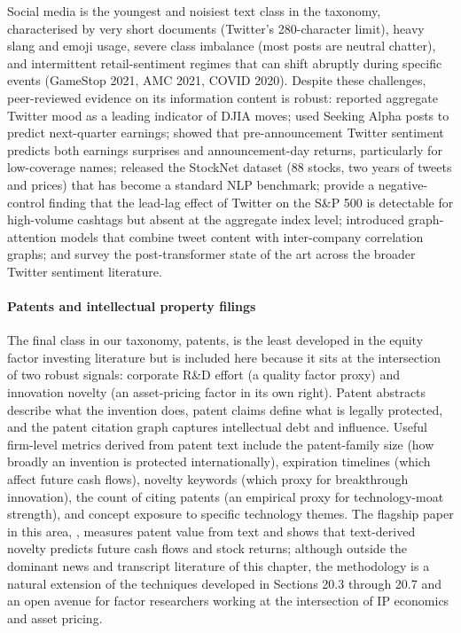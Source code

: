 Social media is the youngest and noisiest text class in the taxonomy, characterised by very short documents (Twitter's 280-character limit), heavy slang and emoji usage, severe class imbalance (most posts are neutral chatter), and intermittent retail-sentiment regimes that can shift abruptly during specific events (GameStop 2021, AMC 2021, COVID 2020). Despite these challenges, peer-reviewed evidence on its information content is robust: \cite{bollen2011twitter} reported aggregate Twitter mood as a leading indicator of DJIA moves; \cite{chen2014wisdom} used Seeking Alpha posts to predict next-quarter earnings; \cite{bartov2018twitter} showed that pre-announcement Twitter sentiment predicts both earnings surprises and announcement-day returns, particularly for low-coverage names; \cite{xu2018stock} released the StockNet dataset (88 stocks, two years of tweets and prices) that has become a standard NLP benchmark; \cite{zheludev2014when} provide a negative-control finding that the lead-lag effect of Twitter on the S\&P 500 is detectable for high-volume cashtags but absent at the aggregate index level; \cite{sawhney2020deep} introduced graph-attention models that combine tweet content with inter-company correlation graphs; and \cite{albladi2025twitter} survey the post-transformer state of the art across the broader Twitter sentiment literature.

\paragraph{Patents and intellectual property filings}

The final class in our taxonomy, patents, is the least developed in the equity factor investing literature but is included here because it sits at the intersection of two robust signals: corporate R\&D effort (a quality factor proxy) and innovation novelty (an asset-pricing factor in its own right). Patent abstracts describe what the invention does, patent claims define what is legally protected, and the patent citation graph captures intellectual debt and influence. Useful firm-level metrics derived from patent text include the patent-family size (how broadly an invention is protected internationally), expiration timelines (which affect future cash flows), novelty keywords (which proxy for breakthrough innovation), the count of citing patents (an empirical proxy for technology-moat strength), and concept exposure to specific technology themes. The flagship paper in this area, \cite{kogan2017technological}, measures patent value from text and shows that text-derived novelty predicts future cash flows and stock returns; although outside the dominant news and transcript literature of this chapter, the methodology is a natural extension of the techniques developed in Sections 20.3 through 20.7 and an open avenue for factor researchers working at the intersection of IP economics and asset pricing.

